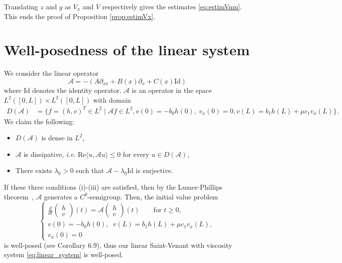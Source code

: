 \documentclass[11pt]{article}
\begin{document}
Translating $z$ and $y$ as $V_{x}$ and $V$ respectively gives the estimates \eqref{eq:estimVmu}. This ends the proof of Proposition \ref{prop:estimVx}.

\section{Well-posedness of the linear system}
\label{app:well_posedness_linear}

We consider the linear operator
\begin{equation}
\mathcal{A} = -(A\partial_{xx}+ B(x)\partial_{x}+C(x) \text{Id})
\end{equation}
where $\text{Id}$ denotes the identity operator. $\mathcal{A}$ is an operator in the space $L^2([0,L]) \times L^2([0,L])$ with domain
\begin{equation}
\begin{split}
D(\mathcal{A}) &= \{f = (h,v)^{T}\in L^{2} \;|\; \mathcal{A}f\in L^{2},
 v(0) = -b_{0}h(0),\;v_{x}(0)=0,
 v(L) = b_{1}h(L)+\mu c_{1}v_{x}(L)\}.
\end{split}
\end{equation}
We claim the following:
\begin{itemize}
\item[(i)] $D(\mathcal{A})$ is dense in $L^{2}$,
\item[(ii)] $\mathcal{A}$ is dissipative, \emph{i.e.} $\text{Re} \langle u, \mathcal{A}u \rangle \leq 0$ for every $u\in D(\mathcal{A})$,
\item[(iii)] There exists $\lambda_{0}>0$ such that $\mathcal{A}-\lambda_{0} \text{Id}$ is surjective.
\end{itemize}

If these three conditions (i)-(iii) are satisfied, then by the Lumer-Phillips theorem~\cite{lumer1961dissipative,renardy2004introduction}, $\mathcal{A}$ generates a $C^0$-semigroup. Then, the initial value problem
\begin{equation}
    \begin{cases}
        \displaystyle \frac{d}{dt} \begin{pmatrix}h \\ v\end{pmatrix}(t) = \mathcal{A} \begin{pmatrix}h \\ v\end{pmatrix}(t) \qquad \text{for } t \geq 0, \\
        v(0) = -b_{0}h(0),\;\; 
        v(L) = b_{1}h(L)+\mu c_{1}v_{x}(L), \\ v_{x}(0)=0
    \end{cases}
\end{equation}
is well-posed (see \cite{engel2000oneparameter} Corollary 6.9), thus our linear Saint-Venant with viscosity system \eqref{eq:linear_system} is well-posed.
\end{document}
